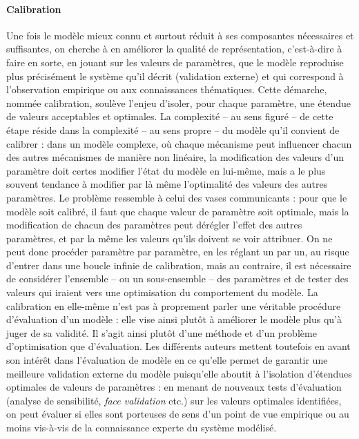 \paragraph{Calibration}
Une fois le modèle mieux connu et surtout réduit à ses composantes nécessaires et suffisantes, on cherche à en améliorer la qualité de représentation, c'est-à-dire à faire en sorte, en jouant sur les valeurs de paramètres, que le modèle reproduise plus précisément le système qu'il décrit (validation externe) et qui correspond à l'observation empirique ou aux connaissances thématiques.
Cette démarche, nommée calibration, soulève l'enjeu d'isoler, pour chaque paramètre, une étendue de valeurs acceptables et optimales.
La complexité -- au sens figuré -- de cette étape réside dans la complexité -- au sens propre -- du modèle qu'il convient de calibrer : dans un modèle complexe, où chaque mécanisme peut influencer chacun des autres mécanismes de manière non linéaire, la modification des valeurs d'un paramètre doit certes modifier l'état du modèle en lui-même, mais a le plus souvent tendance à modifier par là même l'optimalité des valeurs des autres paramètres.
Le problème ressemble à celui des vases communicants : pour que le modèle soit calibré, il faut que chaque valeur de paramètre soit optimale, mais la modification de chacun des paramètres peut dérégler l'effet des autres paramètres, et par la même les valeurs qu'ils doivent se voir attribuer.
On ne peut donc procéder paramètre par paramètre, en les réglant un par un, au risque d'entrer dans une boucle infinie de calibration, mais au contraire, il est nécessaire de considérer l'ensemble -- ou un sous-ensemble -- des paramètres et de tester des valeurs qui iraient vers une optimisation du comportement du modèle.
La calibration en elle-même n'est pas à proprement parler une véritable procédure d'évaluation d'un modèle : elle vise ainsi plutôt à \og améliorer\fg{} le modèle plus qu'à juger de sa validité.
Il s'agit ainsi plutôt d'une méthode et d'un problème d'optimisation que d'évaluation.
Les différents auteurs mettent toutefois en avant son intérêt dans l'évaluation de modèle en ce qu'elle permet de garantir une meilleure validation externe du modèle puisqu'elle aboutit à l'isolation d'étendues optimales de valeurs de paramètres : en menant de nouveaux tests d'évaluation (analyse de sensibilité, \textit{face validation} etc.) \autocite[43]{klugl_validation_2008} sur les valeurs optimales identifiées, on peut évaluer si elles sont porteuses de sens d'un point de vue empirique ou au moins vis-à-vis de la connaissance experte du système modélisé.

